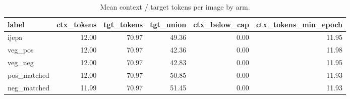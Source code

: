 \begin{table}[t]
\centering
\small
\caption{Mean context / target tokens per image by arm.}
\label{tab:token_budget}
\begin{tabular}{lrrrrr}
\toprule
label & ctx\_tokens & tgt\_tokens & tgt\_union & ctx\_below\_cap & ctx\_tokens\_min\_epoch \\
\midrule
ijepa & 12.00 & 70.97 & 49.36 & 0.00 & 11.95 \\
veg\_pos & 12.00 & 70.97 & 42.36 & 0.00 & 11.98 \\
veg\_neg & 12.00 & 70.97 & 42.83 & 0.00 & 11.95 \\
pos\_matched & 12.00 & 70.97 & 50.85 & 0.00 & 11.93 \\
neg\_matched & 11.99 & 70.97 & 51.45 & 0.00 & 11.93 \\
\bottomrule
\end{tabular}
\end{table}

